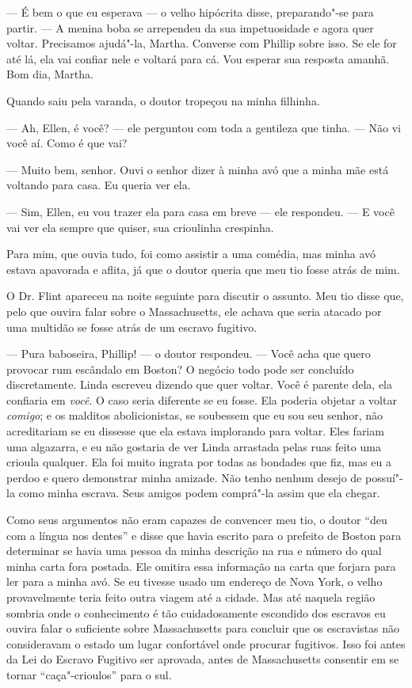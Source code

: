 --- É bem o que eu esperava --- o velho
hipócrita disse, preparando"-se para partir. --- A menina boba se
arrependeu da sua impetuosidade e agora quer voltar. Precisamos
ajudá"-la, Martha. Converse com Phillip sobre isso. Se ele for até lá,
ela vai confiar nele e voltará para cá. Vou esperar sua resposta amanhã.
Bom dia, Martha.

Quando saiu pela varanda, o doutor
tropeçou na minha filhinha.

--- Ah, Ellen, é você? --- ele perguntou com toda a gentileza que tinha.
--- Não vi você aí. Como é que vai?

--- Muito bem, senhor. Ouvi o senhor
dizer à minha avó que a minha mãe está voltando para casa. Eu queria ver
ela.

--- Sim, Ellen, eu vou trazer ela para
casa em breve --- ele respondeu. --- E você vai ver ela sempre que
quiser, sua crioulinha crespinha.

Para mim, que ouvia tudo, foi como
assistir a uma comédia, mas minha avó estava apavorada e aflita, já que
o doutor queria que meu tio fosse atrás de mim.

O Dr. Flint apareceu na noite seguinte
para discutir o assunto. Meu tio disse que, pelo que ouvira falar sobre
o Massachusetts, ele achava que seria atacado por uma multidão se fosse
atrás de um escravo fugitivo.

--- Pura baboseira, Phillip! --- o doutor respondeu. --- Você acha que
quero provocar rum escândalo em Boston? O negócio todo pode ser
concluído discretamente. Linda escreveu dizendo que quer voltar. Você é
parente dela, ela confiaria em \emph{você}. O caso seria diferente se eu
fosse. Ela poderia objetar a voltar \emph{comigo}; e os malditos
abolicionistas, se soubessem que eu sou seu senhor, não acreditariam se
eu dissesse que ela estava implorando para voltar. Eles fariam uma
algazarra, e eu não gostaria de ver Linda arrastada pelas ruas feito uma
crioula qualquer. Ela foi muito ingrata por todas as bondades que fiz,
mas eu a perdoo e quero demonstrar minha amizade. Não tenho nenhum
desejo de possuí"-la como minha escrava. Seus amigos podem comprá"-la
assim que ela chegar.

Como seus argumentos não eram capazes
de convencer meu tio, o doutor ``deu com a língua nos dentes'' e disse
que havia escrito para o prefeito de Boston para determinar se havia uma
pessoa da minha descrição na rua e número do qual minha carta fora
postada. Ele omitira essa informação na carta que forjara para ler para
a minha avó. Se eu tivesse usado um endereço de Nova York, o velho
provavelmente teria feito outra viagem até a cidade. Mas até naquela
região sombria onde o conhecimento é tão cuidadosamente escondido dos
escravos eu ouvira falar o suficiente sobre Massachusetts para concluir
que os escravistas não consideravam o estado um lugar confortável onde
procurar fugitivos. Isso foi antes da Lei do Escravo Fugitivo ser
aprovada, antes de Massachusetts consentir em se tornar
``caça"-crioulos'' para o sul.

